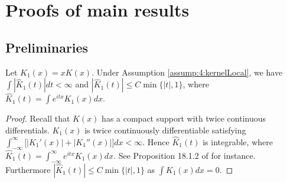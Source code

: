 \section{Proofs of main results} 

\subsection{Preliminaries}
\begin{lem}  Let $K_1(x)=xK(x)$. Under Assumption \ref{assump:4:kernelLocal}, we have
$\int|\hat K_1(t)|dt<\infty$ and $|\hat K_1(t)|\le C\min\{|t|,1\}$, where $\hat K_1(t)=\int e^{itx}K_1(x)dx$.
\end{lem}

\begin{proof} Recall that $K(x)$ has a compact
support with twice continuous differentials.
 $K_1(x)$ is twice continuously differentiable satisfying $\int_{-\infty}^{\infty}
\big[|K_1'(x)|+|K_1''(x)|\big]dx<\infty$.
Hence $\widehat K_1(t)$ is integrable, where
 $\widehat K_1(t)=\int_{-\infty}^{\infty}e^{itx}K_1(x)dx$.
See Proposition 18.1.2 of \cite{gasquetwitomski1999} for instance.
Furthermore $|\widehat K_1(t)|\le C\min\{|t|, 1\}$ as $\int K_1(x)dx=0$.
\end{proof}

